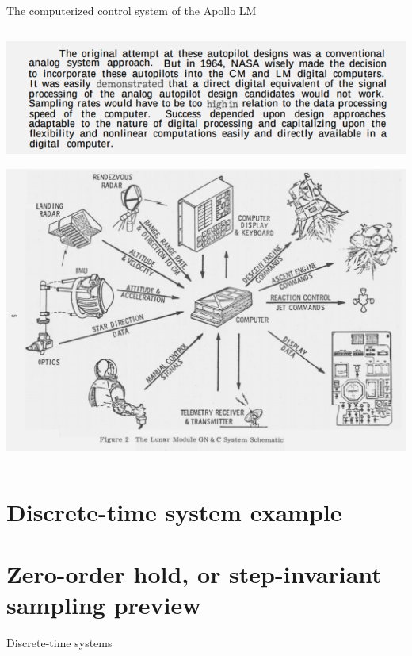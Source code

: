 \documentclass[presentation,aspectratio=169]{beamer}
\begin{document}
\begin{frame}[label={sec:orgb5d68d5}]{The computerized control system of the Apollo LM}
\begin{columns}
\begin{column}{0.7\columnwidth}
\begin{center}
 \includegraphics[width=.7\linewidth]{../../figures/Hoag-report-2.png}
\end{center}

\pause

\begin{center}
 \includegraphics[width=.7\linewidth]{../../figures/Hoag-report-fig2.png}
\end{center}
\end{column}
\end{columns}
\end{frame}

\section{Discrete-time system example}
\label{sec:org8d99aa8}

\section{Zero-order hold, or step-invariant sampling preview}
\label{sec:orgebff7e1}

\begin{frame}[label={sec:org593e80e}]{Discrete-time systems}
\end{frame}
\end{document}

